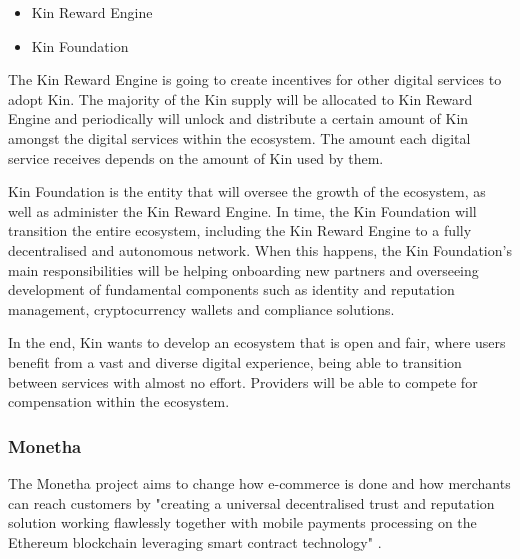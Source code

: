 \begin{itemize}
	\item Kin Reward Engine
	\item Kin Foundation
\end{itemize}

The Kin Reward Engine is going to create incentives for other digital services to adopt Kin. The majority of the Kin supply will be allocated to Kin Reward Engine and periodically will unlock and distribute a certain amount of Kin amongst the digital services within the ecosystem. The amount each digital service receives depends on the amount of Kin used by them.

\medskip

Kin Foundation is the entity that will oversee the growth of the ecosystem, as well as administer the Kin Reward Engine. In time, the Kin Foundation will transition the entire ecosystem, including the Kin Reward Engine to a fully decentralised and autonomous network. When this happens, the Kin Foundation's main responsibilities will be helping onboarding new partners and overseeing development of fundamental components such as identity and reputation management, cryptocurrency wallets and compliance solutions.

\medskip

In the end, Kin wants to develop an ecosystem that is open and fair, where users benefit from a vast and diverse digital experience, being able to transition between services with almost no effort. Providers will be able to compete for compensation within the ecosystem.

\subsubsection{Monetha}

The Monetha project aims to change how e-commerce is done and how merchants can reach customers by "creating a universal decentralised trust and reputation solution working flawlessly together with mobile payments processing on the Ethereum blockchain leveraging smart contract technology" \cite{MONETHA}.

\medskip

